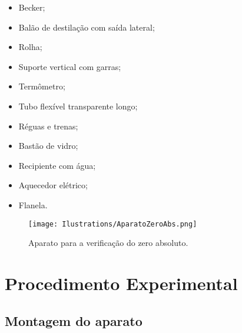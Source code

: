 \begin{multicols}{2}
\begin{itemize}
	\item Becker;
	\item Balão de destilação com saída lateral;
	\item Rolha;
	\item Suporte vertical com garras;
	\item Termômetro;
	\item Tubo flexível transparente longo;
	\item Réguas e trenas;
	\item Bastão de vidro;
	\item Recipiente com água;
    \item Aquecedor elétrico;
	\item Flanela.
\end{itemize}
\end{multicols}

\begin{figure}[!h]
\centering
\forceversofloat
\texttt{[image: Ilustrations/AparatoZeroAbs.png]}
\caption{Aparato para a verificação do zero absoluto.}
\end{figure}
\section{Procedimento Experimental}

\subsection{Montagem do aparato}

